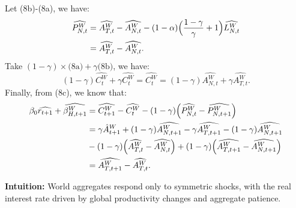 \documentclass[a4paper,12pt]{article} %
\theoremstyle{nonitalic}
\begin{document}
Let (8b)-(8a), we have:
\begin{align*}
     \widehat{P_{N,t}^W} &=  \widehat{A_{T,t}^W} -  \widehat{A_{N,t}^W} - (1-\alpha)\Bigl(\frac{1-\gamma}{\gamma} + 1\Bigr)  \widehat{L_{N,t}^W} \\
    &=  \widehat{A_{T,t}^W} -  \widehat{A_{N,t}^W}.
\end{align*}
Take $(1-\gamma) \times \text{(8a)} + \gamma \text{(8b)}$, we have:
\[
(1-\gamma)  \widehat{C_t^W} + \gamma  \widehat{C_t^W} =  \widehat{C_t^W} = (1-\gamma)  \widehat{A_{N,t}^W} + \gamma  \widehat{A_{T,t}^W}.
\]
Finally, from (8c), we know that:
\begin{align*}
    \beta_0  \widehat{r_{t+1}} + \widehat{\beta_{H, t+1}^W} &=  \widehat{C_{t+1}^W} -  \widehat{C_t^W} - (1-\gamma)\Bigl( \widehat{P_{N,t}^W} - \widehat{P_{N, t+1}^W}\Bigr) \\
    &= \gamma \hat{A}_{t+1}^W + (1-\gamma)  \widehat{A_{N,t+1}^W} - \gamma  \widehat{A_{T,t+1}^W} - (1-\gamma)  \widehat{A_{N,t+1}^W} \\
    \quad \quad &- (1-\gamma)\Bigl( \widehat{A_{T,t}^W} -  \widehat{A_{N,t}^W}\Bigr) + (1-\gamma) \Bigl( \widehat{A_{T,t+1}^W} - \widehat{A_{N, t+1}^W} \Bigr) \\
    &= \widehat{A_{T, t+1}^W} -  \widehat{A_{T,t}^W}.
\end{align*}

\textbf{Intuition:} World aggregates respond only to symmetric shocks, with the real interest rate driven by global productivity changes and aggregate patience.
\end{document}

